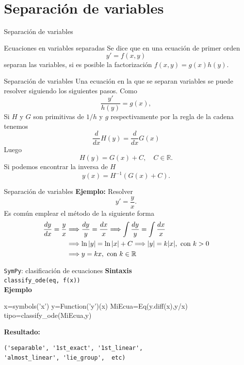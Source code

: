 \documentclass[handout,hyperref={colorlinks=true}]{beamer}
\newcommand{\rr}{\mathbb{R}}
\begin{document}
\section{Separación de variables}
\begin{frame}{Separación de variables}
\begin{block}{Ecuaciones en variables separadas} Se dice que en una ecuación de primer orden
 \[y'=f(x,y)\]
 separan las variables, si es posible la factorización $f(x,y)=g(x)h(y)$.
 \end{block}



\end{frame}

\begin{frame}{Separación de variables} 
Una ecuación  en la que se separan variables se puede resolver siguiendo los siguientes pasos. Como
\[\frac{y'}{h(y)}=g(x),\]
Si $H$ y $G$ son primitivas de $1/h$ y $g$ respectivamente por la regla de la cadena tenemos
\[\frac{d}{dx}H(y)=\frac{d}{dx}G(x)\]
Luego 
\[H(y)=G(x)+C,\quad C\in\rr.\]
Si podemos encontrar la inversa de $H$
\[y(x)=H^{-1}\left(G(x)+C\right).\]


\end{frame}

\begin{frame}{Separación de variables} 
\textbf{Ejemplo:} Resolver
\[y'=\frac{y}{x}.\]
Es común emplear el método de la siguiente forma
\[\begin{split}
   \frac{dy}{dx}=\frac{y}{x} &\Longrightarrow \frac{dy}{y}=\frac{dx}{x} \Longrightarrow \int \frac{dy}{y}=\int \frac{dx}{x}\\
   &\Longrightarrow\ln|y|=\ln|x|+C \Longrightarrow |y|= k|x|, \hbox{ con }k>0\\
   &\Longrightarrow y= kx, \hbox{ con }k\in\rr
  \end{split}
\]

\end{frame}


\begin{frame}[fragile]{\texttt{SymPy}: clasificación de ecuaciones} 
\textbf{Sintaxis}\\
\texttt{classify\_ode(eq, f(x))}\\
\textbf{Ejemplo}
\begin{sageblock}
x=symbols('x')
y=Function('y')(x)
MiEcua=Eq(y.diff(x),y/x)
tipo=classify_ode(MiEcua,y)
\end{sageblock}
\textbf{Resultado:}\\
\begin{verbatim}
('separable', '1st_exact', '1st_linear', 
'almost_linear', 'lie_group',  etc)
\end{verbatim}


\end{frame}
\end{document}
